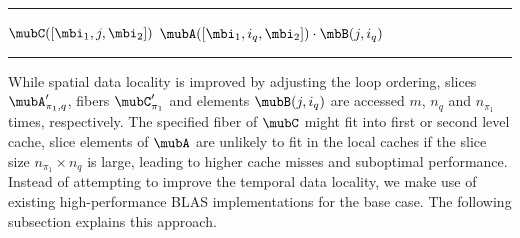 \begin{algorithm}[t]
\DontPrintSemicolon
{}
%
\footnotesize 
\SetAlgoVlined
\hrule
\BlankLine
{}
{
	{
	}
	{
		{
			\;
		}		
	}	
	\Else%
	{
		{
			{			
				{
					$\mubC([\mbi_1,j,\mbi_2])$ \ttt{+=} $\mubA([\mbi_1,i_q,\mbi_2]) \cdot \mbB(j,i_q)$\;
				}
			}
		}
	}
}
\BlankLine
\hrule
\caption{
\footnotesize %
Modified baseline algorithm for TTM with contiguous memory access.
The tensor order $p$ must be greater than $1$ and the contraction mode $q$ must satisfy $1 \leq q \leq p$ and $\pi_1 \neq q$.
The initial call must happen with $r=p$ where $\mbn$ is the shape tuple of $\mubA$ and $m$ is the $q$-th dimension of $\mubC$. 
\label{alg:ttm.sequential.coalesced}
}
\end{algorithm}

While spatial data locality is improved by adjusting the loop ordering, slices $\mubA_{\pi_1,q}'$, fibers $\mubC_{\pi_1}'$ and elements $\mubB(j,i_q)$ are accessed $m$, $n_q$ and $n_{\pi_1}$ times, respectively.
The specified fiber of $\mubC$ might fit into first or second level cache, slice elements of $\mubA$ are unlikely to fit in the local caches if the slice size $n_{\pi_1} \times n_q$ is large, leading to higher cache misses and suboptimal performance.
Instead of attempting to improve the temporal data locality, we make use of existing high-performance BLAS implementations for the base case.
The following subsection explains this approach.

